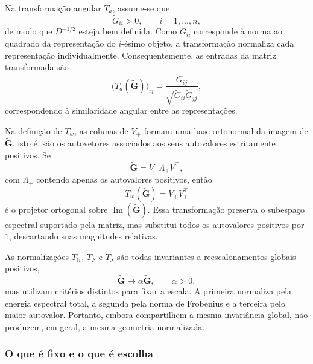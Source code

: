Na transformação angular $T_a$, assume-se que
\begin{equation*}
    \widetilde{G}_{ii}>0,
    \qquad
    i=1,\dots,n,
\end{equation*}
de modo que $D^{-1/2}$ esteja bem definida. Como
$\widetilde{G}_{ii}$ corresponde à norma ao quadrado da representação do $i$-ésimo objeto, a transformação normaliza cada representação individualmente. Consequentemente, as entradas da matriz transformada são
\begin{equation}
    \bigl(T_a(\widetilde{\mathbf{G}})\bigr)_{ij} =
    \frac{
        \widetilde{G}_{ij}
    }{
        \sqrt{
            \widetilde{G}_{ii}
            \widetilde{G}_{jj}
        }
    },
\end{equation}
correspondendo à similaridade angular entre as representações.

Na definição de $T_w$, as colunas de $V_+$ formam uma base ortonormal da imagem de $\widetilde{\mathbf{G}}$, isto é, são os autovetores associados aos seus autovalores estritamente positivos. Se
\begin{equation*}
    \widetilde{\mathbf{G}} = V_+\Lambda_+V_+^\top,
\end{equation*}
com $\Lambda_+$ contendo apenas os autovalores positivos, então
\begin{equation}
    T_w(\widetilde{\mathbf{G}}) = V_+V_+^\top
\end{equation}
é o projetor ortogonal sobre
$\operatorname{Im}(\widetilde{\mathbf{G}})$. Essa transformação preserva o subespaço espectral suportado pela matriz, mas substitui todos os autovalores positivos por $1$, descartando suas magnitudes relativas.

As normalizações $T_{\mathrm{tr}}$, $T_F$ e $T_\lambda$ são todas invariantes a reescalonamentos globais positivos,
\begin{equation*}
    \widetilde{\mathbf{G}}
    \longmapsto
    \alpha\widetilde{\mathbf{G}},
    \qquad
    \alpha>0,
\end{equation*}
mas utilizam critérios distintos para fixar a escala. A primeira normaliza pela energia espectral total, a segunda pela norma de Frobenius e a terceira pelo maior autovalor. Portanto, embora compartilhem a mesma invariância global, não produzem, em geral, a mesma geometria normalizada.

\subsubsection*{O que é fixo e o que é escolha}

